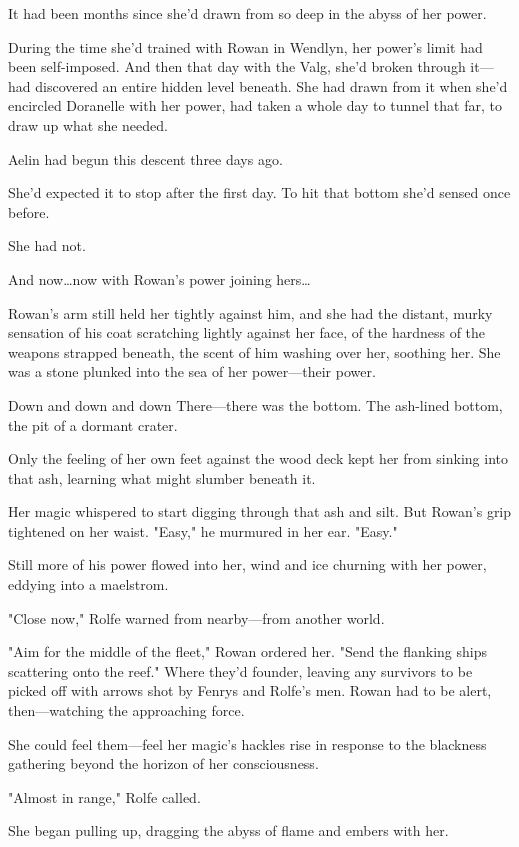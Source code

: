 It had been months since she'd drawn from so deep in the abyss of her power.

During the time she'd trained with Rowan in Wendlyn, her power's limit had been self-imposed.
And then that day with the Valg, she'd broken through it--- had discovered an entire hidden level beneath.
She had drawn from it when she'd encircled Doranelle with her power, had taken a whole day to tunnel that far, to draw up what she needed.

Aelin had begun this descent three days ago.

She'd expected it to stop after the first day.
To hit that bottom she'd sensed once before.

She had not.

And now\ldots now with Rowan's power joining hers\ldots{}

Rowan's arm still held her tightly against him, and she had the distant, murky sensation of his coat scratching lightly against her face, of the hardness of the weapons strapped beneath, the scent of him washing over her, soothing her.
She was a stone plunked into the sea of her power---their power.

Down and down and down There---there was the bottom.
The ash-lined bottom, the pit of a dormant crater.

Only the feeling of her own feet against the wood deck kept her from sinking into that ash, learning what might slumber beneath it.

Her magic whispered to start digging through that ash and silt.
But Rowan's grip tightened on her waist.
"Easy," he murmured in her ear.
"Easy."

Still more of his power flowed into her, wind and ice churning with her power, eddying into a maelstrom.

"Close now," Rolfe warned from nearby---from another world.

"Aim for the middle of the fleet," Rowan ordered her.
"Send the flanking ships scattering onto the reef."
Where they'd founder, leaving any survivors to be picked off with arrows shot by Fenrys and Rolfe's men.
Rowan had to be alert, then---watching the approaching force.

She could feel them---feel her magic's hackles rise in response to the blackness gathering beyond the horizon of her consciousness.

"Almost in range," Rolfe called.

She began pulling up, dragging the abyss of flame and embers with her.

